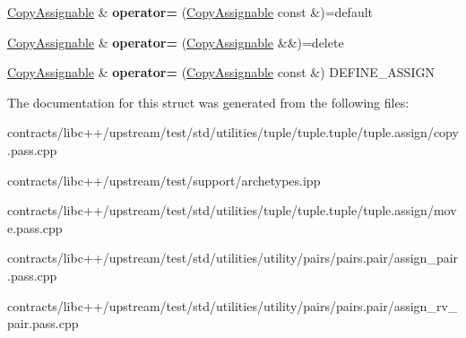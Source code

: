 \begin{DoxyCompactItemize}
\item 
\mbox{\label{struct_copy_assignable_a82d221cd5a8d0f7476a64a75af3469f1}} 
\mbox{\hyperlink{struct_copy_assignable}{Copy\+Assignable}} \& {\bfseries operator=} (\mbox{\hyperlink{struct_copy_assignable}{Copy\+Assignable}} const \&)=default
\item 
\mbox{\label{struct_copy_assignable_ab66c66b8310e0a1b43d524d42bffa9b3}} 
\mbox{\hyperlink{struct_copy_assignable}{Copy\+Assignable}} \& {\bfseries operator=} (\mbox{\hyperlink{struct_copy_assignable}{Copy\+Assignable}} \&\&)=delete
\item 
\mbox{\label{struct_copy_assignable_a7d6e78ae1f750a467c9a5c28673a25d9}} 
\mbox{\hyperlink{struct_copy_assignable}{Copy\+Assignable}} \& {\bfseries operator=} (\mbox{\hyperlink{struct_copy_assignable}{Copy\+Assignable}} const \&) D\+E\+F\+I\+N\+E\+\_\+\+A\+S\+S\+I\+GN
\end{DoxyCompactItemize}


The documentation for this struct was generated from the following files\+:\begin{DoxyCompactItemize}
\item 
contracts/libc++/upstream/test/std/utilities/tuple/tuple.\+tuple/tuple.\+assign/copy.\+pass.\+cpp\item 
contracts/libc++/upstream/test/support/archetypes.\+ipp\item 
contracts/libc++/upstream/test/std/utilities/tuple/tuple.\+tuple/tuple.\+assign/move.\+pass.\+cpp\item 
contracts/libc++/upstream/test/std/utilities/utility/pairs/pairs.\+pair/assign\+\_\+pair.\+pass.\+cpp\item 
contracts/libc++/upstream/test/std/utilities/utility/pairs/pairs.\+pair/assign\+\_\+rv\+\_\+pair.\+pass.\+cpp\end{DoxyCompactItemize}
